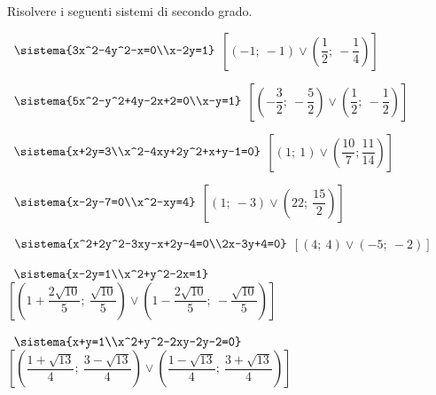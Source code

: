 \begin{esercizio}[\Ast]
 \label{ese:6.7}
Risolvere i seguenti sistemi di secondo grado.
 \begin{enumeratea}
 \item~\(\sistema{3x^2-4y^2-x=0\\x-2y=1}\)
\hfill\(\left[\left(-1;~-1\right)\vee \left(\dfrac 1 2;~-\dfrac 1 
4\right)\right]\)
 
\item~\(\sistema{5x^2-y^2+4y-2x+2=0\\x-y=1}\)
\hfill\(\left[\left(-\dfrac 3 2;~-\dfrac 5 2\right) \vee 
       \left(\dfrac 1 2;~-\dfrac 1 2\right)\right]\)
 
\item~\(\sistema{x+2y=3\\x^2-4xy+2y^2+x+y-1=0}\)
\hfill\(\left[\left(1;~1\right)\vee \left(\dfrac{10} 7;
    \dfrac{11}{14}\right)\right]\)
 \item~\(\sistema{x-2y-7=0\\x^2-xy=4}\)
\hfill\(\left[\left(1;~-3\right)\vee \left(22;~\dfrac{15}{2}\right)\right]\)
\item~\(\sistema{x^2+2y^2-3xy-x+2y-4=0\\2x-3y+4=0}\)
\hfill\(\left[\left(4;~4\right)\vee \left(-5;~-2\right)\right]\)
 \item~\(\sistema{x-2y=1\\x^2+y^2-2x=1}\)
\hfill\(\left[\left(1+\dfrac{2\sqrt{10}} 5;~\dfrac{\sqrt{10}} 5\right)\vee 
\left(1-\dfrac{2\sqrt{10}} 5;~-\dfrac{\sqrt{10}} 5\right)\right]\)
 
\item~\(\sistema{x+y=1\\x^2+y^2-2xy-2y-2=0}\)
\hfill\(\left[\left(\dfrac{1+\sqrt{13}} 4;~\dfrac{3-\sqrt{13}} 4\right)\vee 
\left(\dfrac{1-\sqrt{13}} 4;~\dfrac{3+\sqrt{13}} 4\right)\right]\)
%  
 \end{enumeratea}
\end{esercizio}

